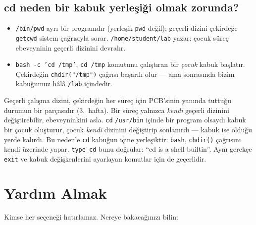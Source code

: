 \documentclass[11pt,a4paper]{article}
\newcommand{\cmd}[1]{\texttt{#1}}
\begin{document}
\subsection{cd neden bir kabuk yerleşiği olmak zorunda?}
\label{sec:cdbuiltin}


\begin{itemize}
  \item \texttt{/bin/pwd} ayrı bir programdır (yerleşik \cmd{pwd} değil); geçerli dizini çekirdeğe \texttt{getcwd} sistem çağrısıyla sorar. \texttt{/home/student/lab} yazar: çocuk süreç ebeveyninin geçerli dizinini devralır.
  \item \cmd{bash -c 'cd /tmp'}, \cmd{cd /tmp} komutunu çalıştıran bir \emph{çocuk} kabuk başlatır. Çekirdeğin \texttt{chdir("/tmp")} çağrısı başarılı olur --- ama sonrasında bizim kabuğumuz hâlâ \texttt{\tl/lab} içindedir.
\end{itemize}

\begin{keyidea}
Geçerli çalışma dizini, çekirdeğin her süreç için PCB'sinin yanında tuttuğu durumun bir parçasıdır (3.\ hafta). Bir süreç yalnızca \emph{kendi} geçerli dizinini değiştirebilir, ebeveyninkini asla. \cmd{cd} \texttt{/usr/bin} içinde bir program olsaydı kabuk bir çocuk oluşturur, çocuk \emph{kendi} dizinini değiştirip sonlanırdı --- kabuk ise olduğu yerde kalırdı. Bu nedenle \cmd{cd} kabuğun içine yerleşiktir: \cmd{bash}, \texttt{chdir()} çağrısını kendi üzerinde yapar. \cmd{type cd} bunu doğrular: ``cd is a shell builtin''. Aynı gerekçe \cmd{exit} ve kabuk değişkenlerini ayarlayan komutlar için de geçerlidir.
\end{keyidea}

\section{Yardım Almak}
\label{sec:help}

Kimse her seçeneği hatırlamaz. Nereye bakacağınızı bilin:
\end{document}
